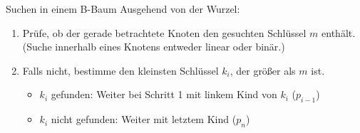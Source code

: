 \documentclass[german]{../spicker}
\begin{document}
\begin{algo}{Suchen in einem B-Baum}
    Ausgehend von der Wurzel:
    \begin{enumerate}
        \item Prüfe, ob der gerade betrachtete Knoten den gesuchten Schlüssel $m$ enthält.
              \subitem (Suche innerhalb eines Knotens entweder linear oder binär.)
        \item Falls nicht, bestimme den kleinsten Schlüssel $k_i$, der größer als $m$ ist.
              \begin{itemize}
                  \item $k_i$ gefunden: Weiter bei Schritt 1 mit linkem Kind von $k_i$ ($p_{i-1}$)
                  \item $k_i$ nicht gefunden: Weiter mit letztem Kind ($p_{n}$)
              \end{itemize}
    \end{enumerate}
\end{algo}
\end{document}
